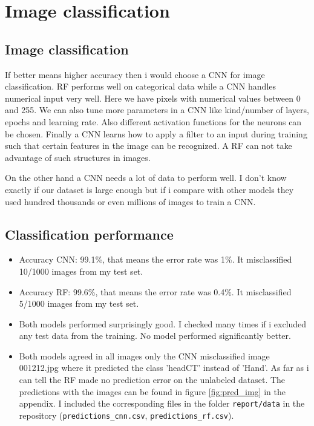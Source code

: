 \documentclass[]{article}
\begin{document}
	\section{Image classification}
	\subsection{Image classification}
	If better means higher accuracy then i would choose a CNN for image classification. RF performs well on categorical data while a CNN handles numerical input very well. Here we have pixels with numerical values between 0 and 255. We can also tune more parameters in a CNN like kind/number of layers, epochs and learning rate. Also different activation functions for the neurons can be chosen. Finally a CNN learns how to apply a filter to an input during training such that certain features in the image can be recognized. A RF can not take advantage of such structures in images.
	
	On the other hand a CNN needs a lot of data to perform well. I don't know exactly if our dataset is large enough but if i compare with other models they used hundred thousands or even millions of images to train a CNN.

	\subsection{Classification performance}
	\begin{itemize}
		\item Accuracy CNN: 99.1\%, that means the error rate was 1\%. It misclassified 10/1000 images from my test set.
		\item Accuracy RF: 99.6\%, that means the error rate was 0.4\%. It misclassified 5/1000 images from my test set.
		\item Both models performed surprisingly good. I checked many times if i excluded any test data from the training. No model performed significantly better.
		\item Both models agreed in all images only the CNN misclassified image 001212.jpg where it predicted the class 'headCT' instead of 'Hand'. As far as i can tell the RF made no prediction error on the unlabeled dataset. The predictions with the images can be found in figure \ref{fig:pred_img} in the appendix.
		I included the corresponding files in the folder \texttt{report/data} in the repository (\texttt{predictions\_cnn.csv}, \texttt{predictions\_rf.csv}).
	\end{itemize}
	
\end{document}
